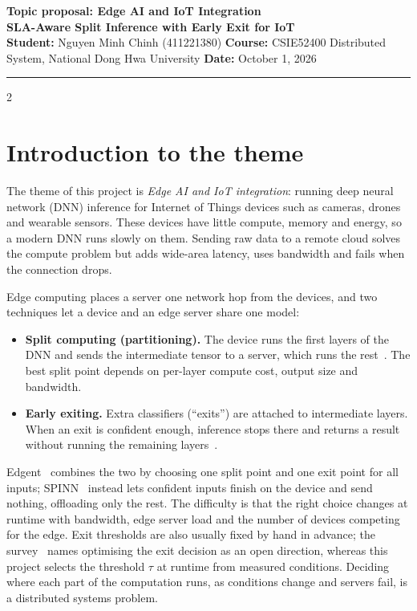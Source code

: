 \documentclass[10pt,a4paper]{article}
\begin{document}
{\sffamily\small\color{accent}\textbf{Topic proposal: Edge AI and IoT Integration}}\\[2pt]
{\large\bfseries SLA-Aware Split Inference with Early Exit for IoT}\\[4pt]
{\sffamily\footnotesize\color{muted}
\textbf{\color{black}Student:} Nguyen Minh Chinh (411221380)\quad
\textbf{\color{black}Course:} CSIE52400 Distributed System, National Dong Hwa University\quad
\textbf{\color{black}Date:} October 1, 2026}\\[-4pt]
{\color{accent}\rule{\textwidth}{1.2pt}}

\vspace{-6pt}
\begin{multicols}{2}

\section{Introduction to the theme}
The theme of this project is \emph{Edge AI and IoT integration}: running deep neural network (DNN) inference for Internet of Things devices such as cameras, drones and wearable sensors. These devices have little compute, memory and energy, so a modern DNN runs slowly on them. Sending raw data to a remote cloud solves the compute problem but adds wide-area latency, uses bandwidth and fails when the connection drops.

Edge computing places a server one network hop from the devices, and two techniques let a device and an edge server share one model:
\begin{itemize}
  \item \textbf{Split computing (partitioning).} The device runs the first layers of the DNN and sends the intermediate tensor to a server, which runs the rest~\cite{neurosurgeon}. The best split point depends on per-layer compute cost, output size and bandwidth.
  \item \textbf{Early exiting.} Extra classifiers (``exits'') are attached to intermediate layers. When an exit is confident enough, inference stops there and returns a result without running the remaining layers~\cite{branchynet}. \end{itemize}
Edgent~\cite{edgent} combines the two by choosing one split point and one exit point for all inputs; SPINN~\cite{spinn} instead lets confident inputs finish on the device and send nothing, offloading only the rest. The difficulty is that the right choice changes at runtime with bandwidth, edge server load and the number of devices competing for the edge. Exit thresholds are also usually fixed by hand in advance; the survey~\cite{survey} names optimising the exit decision as an open direction, whereas this project selects the threshold $\tau$ at runtime from measured conditions. Deciding where each part of the computation runs, as conditions change and servers fail, is a distributed systems problem.


\end{multicols}
\end{document}
